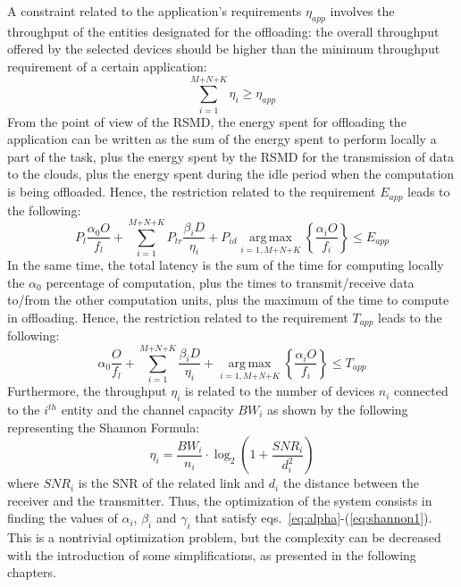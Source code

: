 \documentclass[twoside,openright]{report}
\begin{document}
A constraint related to the application's requirements $\eta_\textit{app}$ involves the throughput of the entities designated for the offloading: the overall throughput offered by the selected devices should be higher than the minimum throughput requirement of a certain application:
 \begin{equation}
\label{eq:throughput}
\sum_{i=1}^\textit{M+N+K} \eta_i \ge \eta_\textit{app}
\end{equation}
From the point of view of the \gls{RSMD}, the energy spent for offloading the application can be written as the sum of the energy spent to perform locally a part of the task, plus the energy spent by the \gls{RSMD} for the transmission of data to the clouds, plus the energy spent during the idle period when the computation is being offloaded. 
Hence, the restriction related to the requirement $E_\textit{app}$ leads to the following:
\begin{equation}
\label{eq:energy}
P_l \frac{\alpha_0 O}{f_l}  + \sum_{i=1}^\textit{M+N+K}{P_\textit{tr}\frac{ \beta_i D}{\eta_i} + P_\textit{id}  \operatorname*{arg\,max}_{i =1,\textit{M+N+K}}\left \{ \frac{\alpha_i O }{f_i} \right \}}\le{E_\textit{app}}
\end{equation}
In the same time, the total latency is the sum of the time for computing locally the $\alpha_0$ percentage of computation, plus the times to transmit/receive data to/from the other computation units, plus the maximum of the time to compute in offloading. Hence, the restriction related to the requirement $T_\textit{app}$ leads to the following:
\begin{equation}
\label{eq:latency}
\alpha_0 \frac{O}{f_l}+ \sum_{i=1}^\textit{M+N+K} \frac{ \beta_i D}{\eta_i} +  \operatorname*{arg\,max}_{i =1,\textit{M+N+K}}\left \{ \frac{\alpha_i O }{f_i} \right \}\le{T_\textit{app}}
\end{equation}
Furthermore, the throughput $\eta_i$ is related to the number of devices $n_i$ connected to the $i^{th}$ entity and the channel capacity $BW_i$ as shown by the following representing the Shannon Formula:
\begin{equation}
\eta_i = \frac{\textit{BW}_i}{n_i}\cdot \log_2{\left(1+\frac{\textit{SNR}_i}{d_i^2}\right)}
\label{eq:shannon1}
\end{equation} 
where $\textit{SNR}_i$ is the \gls{SNR} of the related link and $d_i$ the distance between the receiver and the transmitter. Thus, the optimization of the system consists in finding the values of $\alpha_i$, $\beta_i$ and $\gamma_i$ that satisfy eqs.~\eqref{eq:alpha}-(\ref{eq:shannon1}). This is a nontrivial optimization problem, but the complexity can be decreased with the introduction of some simplifications, as presented in the following chapters.
\end{document}
